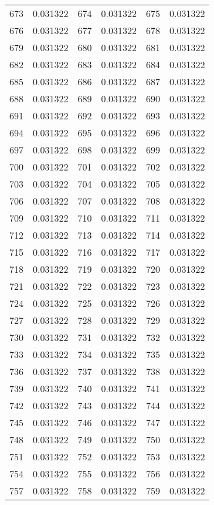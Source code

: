 \documentclass[12pt]{article}
\begin{document}
\begin{longtable}{@{}cc|cc|cc@{}}
673 & 0.031322 & 674 & 0.031322 & 675 & 0.031322 \\
676 & 0.031322 & 677 & 0.031322 & 678 & 0.031322 \\
679 & 0.031322 & 680 & 0.031322 & 681 & 0.031322 \\
682 & 0.031322 & 683 & 0.031322 & 684 & 0.031322 \\
685 & 0.031322 & 686 & 0.031322 & 687 & 0.031322 \\
688 & 0.031322 & 689 & 0.031322 & 690 & 0.031322 \\
691 & 0.031322 & 692 & 0.031322 & 693 & 0.031322 \\
694 & 0.031322 & 695 & 0.031322 & 696 & 0.031322 \\
697 & 0.031322 & 698 & 0.031322 & 699 & 0.031322 \\
700 & 0.031322 & 701 & 0.031322 & 702 & 0.031322 \\
703 & 0.031322 & 704 & 0.031322 & 705 & 0.031322 \\
706 & 0.031322 & 707 & 0.031322 & 708 & 0.031322 \\
709 & 0.031322 & 710 & 0.031322 & 711 & 0.031322 \\
712 & 0.031322 & 713 & 0.031322 & 714 & 0.031322 \\
715 & 0.031322 & 716 & 0.031322 & 717 & 0.031322 \\
718 & 0.031322 & 719 & 0.031322 & 720 & 0.031322 \\
721 & 0.031322 & 722 & 0.031322 & 723 & 0.031322 \\
724 & 0.031322 & 725 & 0.031322 & 726 & 0.031322 \\
727 & 0.031322 & 728 & 0.031322 & 729 & 0.031322 \\
730 & 0.031322 & 731 & 0.031322 & 732 & 0.031322 \\
733 & 0.031322 & 734 & 0.031322 & 735 & 0.031322 \\
736 & 0.031322 & 737 & 0.031322 & 738 & 0.031322 \\
739 & 0.031322 & 740 & 0.031322 & 741 & 0.031322 \\
742 & 0.031322 & 743 & 0.031322 & 744 & 0.031322 \\
745 & 0.031322 & 746 & 0.031322 & 747 & 0.031322 \\
748 & 0.031322 & 749 & 0.031322 & 750 & 0.031322 \\
751 & 0.031322 & 752 & 0.031322 & 753 & 0.031322 \\
754 & 0.031322 & 755 & 0.031322 & 756 & 0.031322 \\
757 & 0.031322 & 758 & 0.031322 & 759 & 0.031322 \\

\end{longtable}
\end{document}
